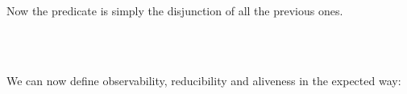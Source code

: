 Now the  predicate is simply the disjunction of all the
previous ones.

\begin{code}%
\>[0]\AgdaSpace{}%
\AgdaSymbol{:}\AgdaSpace{}%
\AgdaSymbol{\}}\AgdaSpace{}%
\AgdaSpace{}%
\AgdaSpace{}%
\AgdaSpace{}%
\AgdaSpace{}%
\<%
\\
\>[0]\AgdaSpace{}%
\AgdaSpace{}%
\AgdaSymbol{=}%
\>[766I]\AgdaSpace{}%
\AgdaSpace{}%
\AgdaSpace{}%
\AgdaSpace{}%
\AgdaSpace{}%
\AgdaSpace{}%
\AgdaSpace{}%
\AgdaSpace{}%
\AgdaSpace{}%
\AgdaSpace{}%
\AgdaSpace{}%
\<%
\\
\>[.][@{}l@{}]\<[766I]%
\>[11]\AgdaSpace{}%
\AgdaSpace{}%
\AgdaSpace{}%
\AgdaSpace{}%
\AgdaSpace{}%
\AgdaSpace{}%
\AgdaSpace{}%
\<%
\end{code}

We can now define observability, reducibility and aliveness in the expected way:

